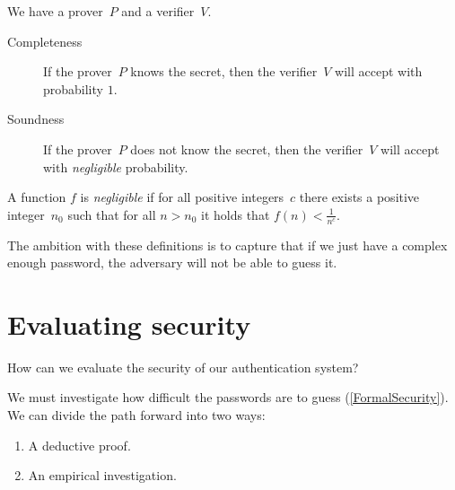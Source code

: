 \begin{frame}
\begin{definition}\label{FormalSecurity}
  We have a prover~\(P\) and a verifier~\(V\).
  \begin{description}
    \item[Completeness] If the prover~\(P\) knows the secret, then the 
      verifier~\(V\) will accept with probability \(1\).
    \item[Soundness] If the prover~\(P\) does not know the secret, then the 
      verifier~\(V\) will accept with \emph{negligible} probability.
  \end{description}
\end{definition}

\begin{definition}[Negligible]\label{Negligible}
  A function \(f\) is \emph{negligible} if for all positive integers~\(c\) 
  there exists a positive integer~\(n_0\) such that for all \(n > n_0\) it 
  holds that \(f(n) < \frac{1}{n^c}\).
\end{definition}
\end{frame}

The ambition with these definitions is to capture that if we just have a 
complex enough password, the adversary will not be able to guess it.


\section{Evaluating security}

\begin{frame}
  \begin{exercise}
    How can we evaluate the security of our authentication system?
  \end{exercise}
\end{frame}

\begin{frame}
  \begin{solution}
    We must investigate how difficult the passwords are to guess 
    (\cref{FormalSecurity}).
    We can divide the path forward into two ways:
    \begin{enumerate}
      \item A deductive proof.
      \item An empirical investigation.
    \end{enumerate}
  \end{solution}

\end{frame}

